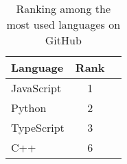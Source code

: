 \begin{table}[ht]
\centering
\caption{Ranking among the most used languages on GitHub}
\label{tab:githubMostUsedLanguageRanking23}
\begin{tabular}[t]{lcc}
\toprule
Language & Rank\\
\midrule
JavaScript & 1\\
Python & 2\\
TypeScript & 3\\
C++ & 6\\
\bottomrule
\end{tabular}
\end{table}
